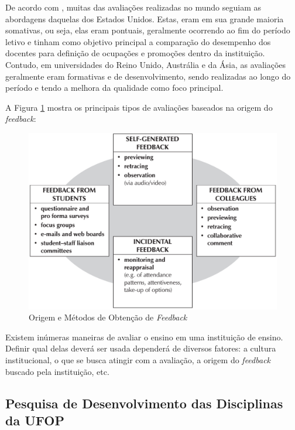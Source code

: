 \documentclass[
  12pt,       %
  openright,      %
  oneside,      %
  a4paper,      %
  english,      %
  french,        %
  spanish,     %
  brazil        %
  ]{abntex2-decsi}
\begin{document}
        De acordo com , muitas das avaliações realizadas no mundo seguiam as abordagens daquelas dos Estados Unidos. Estas, eram em sua grande maioria somativas, ou seja, elas eram pontuais, geralmente ocorrendo ao fim do período letivo e tinham como objetivo principal a comparação do desempenho dos docentes para definição de ocupações e promoções dentro da instituição. Contudo, em universidades do Reino Unido, Austrália e da Ásia, as avaliações geralmente eram formativas e de desenvolvimento, sendo realizadas ao longo do período e tendo a melhora da qualidade como foco principal.
		
         A Figura \ref{fig:feedback_sources} mostra os principais tipos de avaliações baseados na origem do \textit{feedback}: 
         
        \begin{figure}[h]	
           \centering
           \caption{Origem e Métodos de Obtenção de \textit{Feedback}}						   \label{fig:feedback_sources}
           \includegraphics[scale=0.25]{img/feedback_sources_methods}
        \end{figure}   
        
        Existem inúmeras maneiras de avaliar o ensino em uma instituição de ensino. Definir qual delas deverá ser usada dependerá de diversos fatores: a cultura institucional, o que se busca atingir com a avaliação, a origem do \textit{feedback} buscado pela instituição, etc. 
		
        \subsection{Pesquisa de Desenvolvimento das Disciplinas da UFOP}
\end{document}
